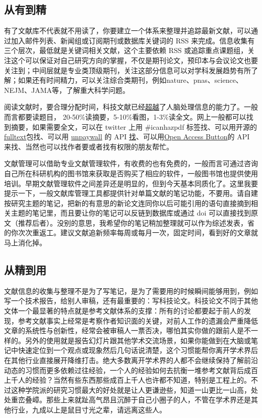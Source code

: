 \documentclass[]{tufte-book}
\begin{document}
\hypertarget{ux4eceux6709ux5230ux7cbe}{%
\subsection{从有到精}\label{ux4eceux6709ux5230ux7cbe}}

有了文献库不代表就不用读了，你要建立一个体系来整理并追踪最新文献，可以通过加入邮件列表、新闻组或订阅期刊或数据库关键词的 RSS 来完成。信息收集有三个层次，最低就是关键词相关文献，这个主要依赖 RSS 或追踪重点课题组，关注这个可以保证对自己研究方向的掌握，不仅是期刊论文，预印本与会议论文也要关注到；中间层就是专业类顶级期刊，关注这部分信息可以对学科发展趋势有所了解；如果还有时间精力，可以关注综合类期刊，例如nature、pnas、science、NEJM、JAMA等，了解重大科学问题。

阅读文献时，要合理分配时间，科技文献已经\href{https://www.alternet.org/news-amp-politics/science-has-outgrown-human-mind-and-its-limited-capacities-process-information}{超越}了人脑处理信息的能力了。一般而言都要读题目， 20-50\%读摘要，5-10\%看图，1-3\%读全文。网上一般都可以找到摘要，如果需要全文，可以在 twitter 上用 \#icanhazpdf 标签找、可以用开源的\href{https://github.com/ropensci/fulltext}{fulltext}包找、可以用 \href{https://unpaywall.org/}{unpaywall} 的 API \href{https://cran.r-project.org/web/packages/roadoi/vignettes/intro.html}{找}、可以用\href{https://openaccessbutton.org/}{Open Access Button}的 API 来找、当然也可以找作者要或者找有权限的朋友帮忙。

文献管理可以借助专业文献管理软件，有收费的也有免费的，一般而言可通过咨询自己所在科研机构的图书馆来获取是否购买了相应的软件，一般图书馆也提供使用培训。早期文献管理软件之间差异还是明显的，但到今天基本同质化了。这里我要提示一下，一般文献库管理工具都提供针对单篇文献的笔记功能，不要用。请自建按研究主题的笔记，把新的有意思的新论文连同你以后可能引用的语句直接摘到相关主题的笔记里，而且要让你的笔记可以反链到数据库或通过 doi 可以直接找到原文（推荐后者）。没别的意思，我希望你的笔记稍加整理就可以作为综述发表，省的你次次重返工。建议文献追新频率每周或每月一次，固定时间，看到好的文章就马上消化掉。

\hypertarget{ux4eceux7cbeux5230ux7528}{%
\subsection{从精到用}\label{ux4eceux7cbeux5230ux7528}}

文献信息的收集与整理不是为了写笔记，是为了需要用的时候瞬间能够用到，例如写一个技术报告，给别人审稿，还有最重要的：写科技论文。科技论文不同于其他文体一个最显著的特点就是参考文献体系的支撑：所有的讨论都要起于前人的发现，参考文献事实上经常是考察作者知识面的关键，对前人工作的遗漏会严重降低文章的系统性与创新性，经常会被审稿人一票否决，哪怕其实你做的跟前人是不一样的。另外的使用就是报告幻灯片跟其他学术交流场景，如果你能做到在大脑或笔记中快速定位到一个观点或现象然后几句话说清楚，这个习惯能帮你离开学术界后在其他行业直接展开降维打击。绝大多数离开学术界的人都不会继续保持了解前沿动态的习惯而更多依赖过往经验，一个人的经验如何去抗衡一堆参考文献背后成百上千人的经验？当然有些东西那些成百上千人也许都不知道，特别是工程上的。不过这种学院派的研究习惯最大的好处就是让人更谦逊些，知道一山更比一山高，处处重峦叠嶂。那些上来就趾高气昂且沉醉于自己小圈子的人，不管在学术界还是其他行业，九成以上是鼠目寸光之辈，请远离这些人。
\end{document}
